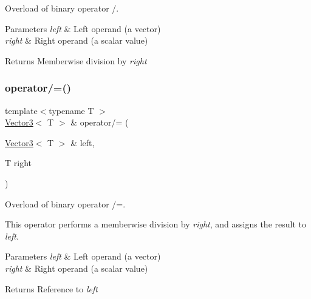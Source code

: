 Overload of binary operator /. 


\begin{DoxyParams}{Parameters}
{\em left} & Left operand (a vector) \\
\hline
{\em right} & Right operand (a scalar value)\\
\hline
\end{DoxyParams}
\begin{DoxyReturn}{Returns}
Memberwise division by {\itshape right} \begin{DoxyVerb}\end{DoxyVerb}
 
\end{DoxyReturn}
\mbox{\label{classsf_1_1_vector3_a8995a700f9dffccc6dddb3696ae17b64}} 
\subsubsection{\texorpdfstring{operator/=()}{operator/=()}}
{\footnotesize\ttfamily template$<$typename T $>$ \\
\mbox{\hyperlink{classsf_1_1_vector3}{Vector3}}$<$ T $>$ \& operator/= (\begin{DoxyParamCaption}\item[{\mbox{\hyperlink{classsf_1_1_vector3}{Vector3}}$<$ T $>$ \&}]{left,  }\item[{T}]{right }\end{DoxyParamCaption})\hspace{0.3cm}{\ttfamily [related]}}



Overload of binary operator /=. 

This operator performs a memberwise division by {\itshape right}, and assigns the result to {\itshape left}.


\begin{DoxyParams}{Parameters}
{\em left} & Left operand (a vector) \\
\hline
{\em right} & Right operand (a scalar value)\\
\hline
\end{DoxyParams}
\begin{DoxyReturn}{Returns}
Reference to {\itshape left} \begin{DoxyVerb}\end{DoxyVerb}
 
\end{DoxyReturn}
\mbox{\label{classsf_1_1_vector3_a388d72db973306a35ba467016b3dee30}} 
